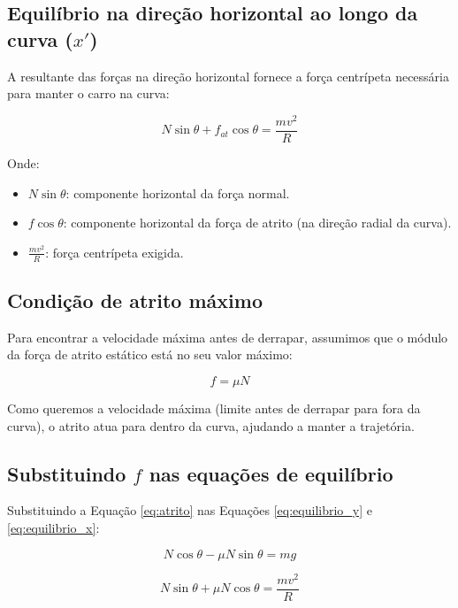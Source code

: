 \begin{flushleft}
\subsection*{Equilíbrio na direção horizontal ao longo da curva (\( x' \))}

A resultante das forças na direção horizontal fornece a força centrípeta necessária para manter o carro na curva:

\begin{equation}
N \sin\theta + f_{at} \cos\theta = \frac{mv^2}{R}
\label{eq:equilibrio_x}
\end{equation}

Onde:

\begin{itemize}
  \item \( N \sin\theta \): componente horizontal da força normal.
  \item \( f \cos\theta \): componente horizontal da força de atrito (na direção radial da curva).
  \item \( \frac{mv^2}{R} \): força centrípeta exigida.
\end{itemize}

\subsection*{Condição de atrito máximo}

Para encontrar a velocidade máxima antes de derrapar, assumimos que o módulo da força de atrito estático está no seu valor máximo:

\begin{equation}
f = \mu N
\label{eq:atrito}
\end{equation}

Como queremos a velocidade máxima (limite antes de derrapar para fora da curva), o atrito atua para dentro da curva, ajudando a manter a trajetória.

\subsection*{Substituindo \( f \) nas equações de equilíbrio}

Substituindo a Equação \eqref{eq:atrito} nas Equações \eqref{eq:equilibrio_y} e \eqref{eq:equilibrio_x}:

\begin{equation}
N \cos\theta - \mu N \sin\theta = mg
\end{equation}

\begin{equation}
N \sin\theta + \mu N \cos\theta = \frac{mv^2}{R}
\end{equation}


\end{flushleft}
